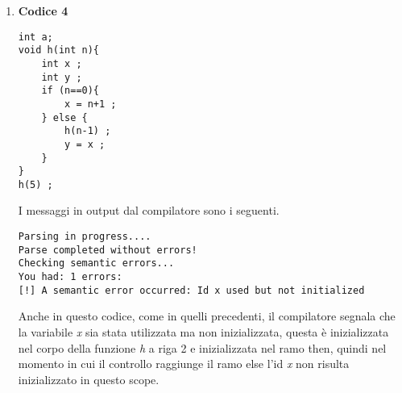 \begin{enumerate}
\item \textbf{Codice 4}
\begin{verbatim}
int a;
void h(int n){
    int x ;
    int y ;
    if (n==0){
        x = n+1 ;
    } else {
        h(n-1) ;
        y = x ;
    }
}
h(5) ;
\end{verbatim}
I messaggi in output dal compilatore sono i seguenti.
\begin{verbatim}
Parsing in progress....
Parse completed without errors!
Checking semantic errors...
You had: 1 errors:
[!] A semantic error occurred: Id x used but not initialized	
\end{verbatim}
Anche in questo codice, come in quelli precedenti, il compilatore segnala che la variabile \textit{x} sia stata utilizzata ma non inizializzata, questa è inizializzata nel corpo della funzione \textit{h} a riga 2 e inizializzata nel ramo then, quindi nel momento in cui il controllo raggiunge il ramo else l'id \textit{x} non risulta inizializzato in questo scope.
\end{enumerate}